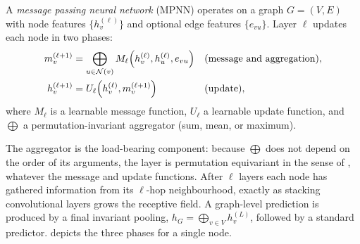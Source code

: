 \begin{definition}
\label{def:graphs:mpnn}
A \emph{message passing neural network} (MPNN) operates on a graph $G = (V, E)$
with node features $\{h_v^{(\ell)}\}$ and optional edge features $\{e_{vu}\}$.
Layer $\ell$ updates each node in two phases:
\begin{align}
  m_v^{(\ell+1)} &= \bigoplus_{u \in \mathcal{N}(v)}
      M_\ell\!\left(h_v^{(\ell)}, h_u^{(\ell)}, e_{vu}\right)
      && \text{(message and aggregation)}, \\
  h_v^{(\ell+1)} &= U_\ell\!\left(h_v^{(\ell)}, m_v^{(\ell+1)}\right)
      && \text{(update)},
\end{align}
where $M_\ell$ is a learnable message function, $U_\ell$ a learnable update
function, and $\bigoplus$ a permutation-invariant aggregator (sum, mean, or
maximum).
\end{definition}

The aggregator is the load-bearing component: because $\bigoplus$ does not depend
on the order of its arguments, the layer is permutation equivariant in the sense
of , whatever the message and update functions. After
$\ell$ layers each node has gathered information from its $\ell$-hop
neighbourhood, exactly as stacking convolutional layers grows the receptive
field. A graph-level prediction is produced by a final invariant pooling,
$h_G = \bigoplus_{v \in V} h_v^{(L)}$, followed by a standard predictor.
 depicts the three phases for a single node.

